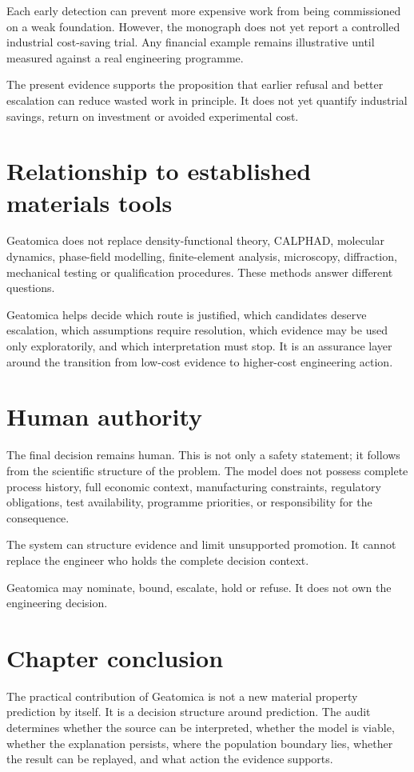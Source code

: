 \documentclass[11pt,a4paper,oneside]{report}
\begin{document}
Each early detection can prevent more expensive work from being commissioned on a weak foundation. However, the monograph does not yet report a controlled industrial cost-saving trial. Any financial example remains illustrative until measured against a real engineering programme.

\begin{claimboundary}
The present evidence supports the proposition that earlier refusal and better escalation can reduce wasted work in principle. It does not yet quantify industrial savings, return on investment or avoided experimental cost.
\end{claimboundary}

\section{Relationship to established materials tools}
Geatomica does not replace density-functional theory, CALPHAD, molecular dynamics, phase-field modelling, finite-element analysis, microscopy, diffraction, mechanical testing or qualification procedures. These methods answer different questions.

Geatomica helps decide which route is justified, which candidates deserve escalation, which assumptions require resolution, which evidence may be used only exploratorily, and which interpretation must stop. It is an assurance layer around the transition from low-cost evidence to higher-cost engineering action.

\section{Human authority}
The final decision remains human. This is not only a safety statement; it follows from the scientific structure of the problem. The model does not possess complete process history, full economic context, manufacturing constraints, regulatory obligations, test availability, programme priorities, or responsibility for the consequence.

The system can structure evidence and limit unsupported promotion. It cannot replace the engineer who holds the complete decision context.

\begin{governingrule}
Geatomica may nominate, bound, escalate, hold or refuse. It does not own the engineering decision.
\end{governingrule}

\section{Chapter conclusion}
The practical contribution of Geatomica is not a new material property prediction by itself. It is a decision structure around prediction. The audit determines whether the source can be interpreted, whether the model is viable, whether the explanation persists, where the population boundary lies, whether the result can be replayed, and what action the evidence supports.
\end{document}
